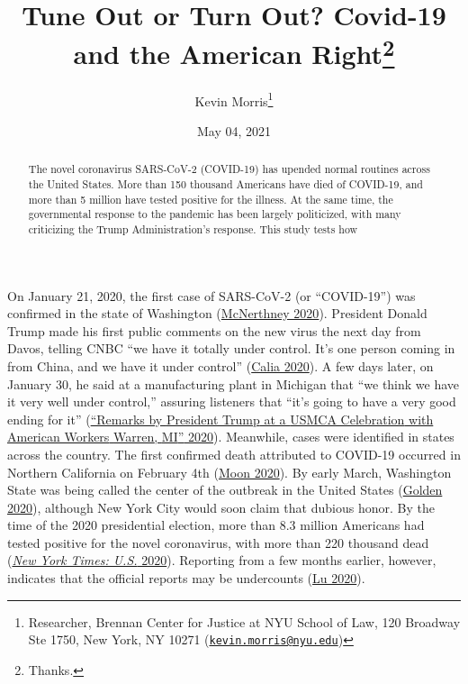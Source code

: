 \documentclass[
  12pt,
]{article}
\title{Tune Out or Turn Out? Covid-19 and the American Right\thanks{Thanks.}}
\author{Kevin Morris\footnote{Researcher, Brennan Center for Justice at NYU School of Law, 120 Broadway Ste 1750, New York, NY 10271 (\href{mailto:kevin.morris@nyu.edu}{\nolinkurl{kevin.morris@nyu.edu}})}}
\date{May 04, 2021}
\begin{document}
\maketitle
\begin{abstract}
The novel coronavirus SARS-CoV-2 (COVID-19) has upended normal routines across the United States. More than 150 thousand Americans have died of COVID-19, and more than 5 million have tested positive for the illness. At the same time, the governmental response to the pandemic has been largely politicized, with many criticizing the Trump Administration's response. This study tests how
\end{abstract}

\pagebreak

\doublespacing

On January 21, 2020, the first case of SARS-CoV-2 (or ``COVID-19'') was confirmed in the state of Washington (\protect\hyperlink{ref-McNerthney2020}{McNerthney 2020}). President Donald Trump made his first public comments on the new virus the next day from Davos, telling CNBC ``we have it totally under control. It's one person coming in from China, and we have it under control'' (\protect\hyperlink{ref-Calia2020}{Calia 2020}). A few days later, on January 30, he said at a manufacturing plant in Michigan that ``we think we have it very well under control,'' assuring listeners that ``it's going to have a very good ending for it'' (\protect\hyperlink{ref-whitehouse2020}{{``Remarks by {President Trump} at a {USMCA Celebration} with {American Workers} \textbar{} {Warren}, {MI}''} 2020}). Meanwhile, cases were identified in states across the country. The first confirmed death attributed to COVID-19 occurred in Northern California on February 4th (\protect\hyperlink{ref-Moon2020}{Moon 2020}). By early March, Washington State was being called the center of the outbreak in the United States (\protect\hyperlink{ref-Golden2020}{Golden 2020}), although New York City would soon claim that dubious honor. By the time of the 2020 presidential election, more than 8.3 million Americans had tested positive for the novel coronavirus, with more than 220 thousand dead (\protect\hyperlink{ref-nyt2020}{\emph{New York Times: U.S.} 2020}). Reporting from a few months earlier, however, indicates that the official reports may be undercounts (\protect\hyperlink{ref-Lu2020}{Lu 2020}).
\end{document}
